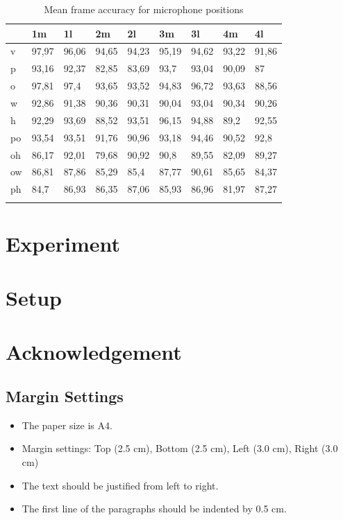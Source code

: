\documentclass[a4paper,12pt]{article}
\begin{document}
\begin{table}[h]
    \centering
    \begin{tabular}{lllllllll}
    & 1m    & 1l    & 2m    & 2l    & 3m    & 3l    & 4m    & 4l    \\
    \hline
    v  & 97,97 & 96,06 & 94,65 & 94,23 & 95,19 & 94,62 & 93,22 & 91,86 \\
    p  & 93,16 & 92,37 & 82,85 & 83,69 & 93,7  & 93,04 & 90,09 & 87    \\
    o  & 97,81 & 97,4  & 93,65 & 93,52 & 94,83 & 96,72 & 93,63 & 88,56 \\
    w  & 92,86 & 91,38 & 90,36 & 90,31 & 90,04 & 93,04 & 90,34 & 90,26 \\
    h  & 92,29 & 93,69 & 88,52 & 93,51 & 96,15 & 94,88 & 89,2  & 92,55 \\
    po & 93,54 & 93,51 & 91,76 & 90,96 & 93,18 & 94,46 & 90,52 & 92,8  \\
    oh & 86,17 & 92,01 & 79,68 & 90,92 & 90,8  & 89,55 & 82,09 & 89,27 \\
    ow & 86,81 & 87,86 & 85,29 & 85,4  & 87,77 & 90,61 & 85,65 & 84,37 \\
    ph & 84,7  & 86,93 & 86,35 & 87,06 & 85,93 & 86,96 & 81,97 & 87,27 \\
    \hline
    \caption{Mean frame accuracy for microphone positions}
	\label{tab:mappingclasses}
    \end{tabular}
\end{table}


\section{Experiment}
\section{Setup}
\section{Acknowledgement}




\subsection{Margin Settings}

\begin{itemize}
	\item The paper size is A4.
	\item Margin settings: Top (2.5 cm), Bottom (2.5 cm), Left (3.0 cm), Right (3.0 cm)
	\item The text should be justified from left to right.
	\item The first line of the paragraphs should be indented by 0.5 cm. 
\end{itemize}
\end{document}
